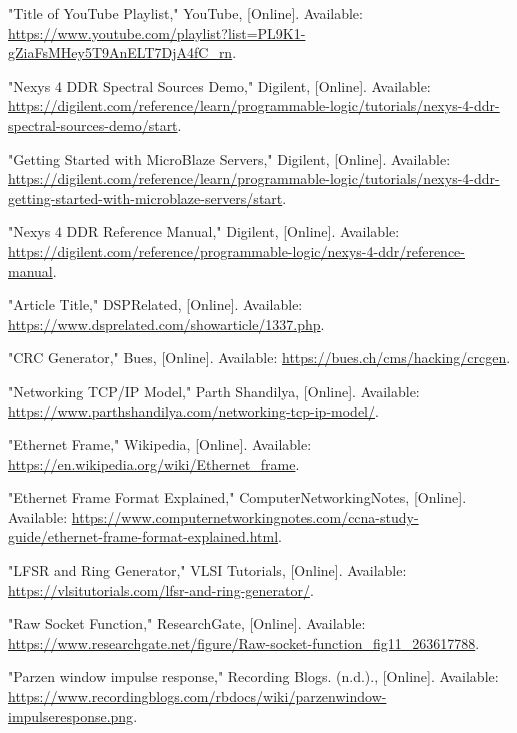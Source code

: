 \newpage

\begin{thebibliography}{99}

"Title of YouTube Playlist," YouTube, [Online]. Available: \url{https://www.youtube.com/playlist?list=PL9K1-gZiaFsMHey5T9AnELT7DjA4fC_rn}.

"Nexys 4 DDR Spectral Sources Demo," Digilent, [Online]. Available: \url{https://digilent.com/reference/learn/programmable-logic/tutorials/nexys-4-ddr-spectral-sources-demo/start}.

"Getting Started with MicroBlaze Servers," Digilent, [Online]. Available: \url{https://digilent.com/reference/learn/programmable-logic/tutorials/nexys-4-ddr-getting-started-with-microblaze-servers/start}.

"Nexys 4 DDR Reference Manual," Digilent, [Online]. Available: \url{https://digilent.com/reference/programmable-logic/nexys-4-ddr/reference-manual}.

"Article Title," DSPRelated, [Online]. Available: \url{https://www.dsprelated.com/showarticle/1337.php}.

"CRC Generator," Bues, [Online]. Available: \url{https://bues.ch/cms/hacking/crcgen}.

"Networking TCP/IP Model," Parth Shandilya, [Online]. Available: \url{https://www.parthshandilya.com/networking-tcp-ip-model/}.

"Ethernet Frame," Wikipedia, [Online]. Available: \url{https://en.wikipedia.org/wiki/Ethernet_frame}.

"Ethernet Frame Format Explained," ComputerNetworkingNotes, [Online]. Available: \url{https://www.computernetworkingnotes.com/ccna-study-guide/ethernet-frame-format-explained.html}.

"LFSR and Ring Generator," VLSI Tutorials, [Online]. Available: \url{https://vlsitutorials.com/lfsr-and-ring-generator/}.

"Raw Socket Function," ResearchGate, [Online]. Available: \url{https://www.researchgate.net/figure/Raw-socket-function_fig11_263617788}.

"Parzen window impulse response," Recording Blogs. (n.d.)., [Online]. Available: \url{https://www.recordingblogs.com/rbdocs/wiki/parzenwindow-impulseresponse.png}.

\end{thebibliography}




